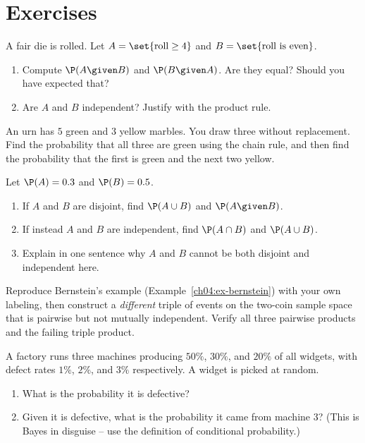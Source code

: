 \section{Exercises}
\label{ch04:exercises}

\begin{exercise}
\label{ch04:exer-warmup}
A fair die is rolled. Let $A = \set{\text{roll} \ge 4}$ and $B = \set{\text{roll is even}}$.
\begin{enumerate}
\item Compute $\P(A\given B)$ and $\P(B\given A)$. Are they equal? Should you have expected that?
\item Are $A$ and $B$ independent? Justify with the product rule.
\end{enumerate}
\end{exercise}

\begin{exercise}
\label{ch04:exer-urn}
An urn has $5$ green and $3$ yellow marbles. You draw three without replacement. Find the probability that all three are green using the chain rule, and then find the probability that the first is green and the next two yellow.
\end{exercise}

\begin{exercise}
\label{ch04:exer-disjoint}
Let $\P(A) = 0.3$ and $\P(B) = 0.5$.
\begin{enumerate}
\item If $A$ and $B$ are disjoint, find $\P(A\cup B)$ and $\P(A\given B)$.
\item If instead $A$ and $B$ are independent, find $\P(A\cap B)$ and $\P(A\cup B)$.
\item Explain in one sentence why $A$ and $B$ cannot be both disjoint and independent here.
\end{enumerate}
\end{exercise}

\begin{exercise}
\label{ch04:exer-bernstein}
Reproduce Bernstein's example (Example~\ref{ch04:ex-bernstein}) with your own labeling, then construct a \emph{different} triple of events on the two-coin sample space that is pairwise but not mutually independent. Verify all three pairwise products and the failing triple product.
\end{exercise}

\begin{exercise}
\label{ch04:exer-lotp}
A factory runs three machines producing $50\%$, $30\%$, and $20\%$ of all widgets, with defect rates $1\%$, $2\%$, and $3\%$ respectively. A widget is picked at random.
\begin{enumerate}
\item What is the probability it is defective?
\item Given it is defective, what is the probability it came from machine $3$? (This is Bayes in disguise -- use the definition of conditional probability.)
\end{enumerate}
\end{exercise}

